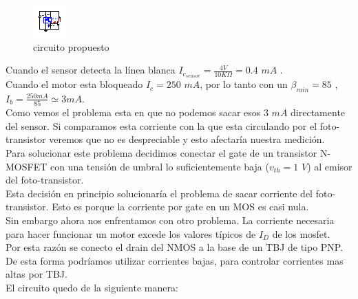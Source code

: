 \documentclass[a4paper]{article}
\begin{document}
\begin{figure}[H]
  \centering
    \includegraphics[width=\textwidth]{./xcircuit/definiendo2.eps}
  \caption{circuito propuesto}
\end{figure}

Cuando el sensor detecta la línea blanca $I_{c_{sensor}}=\frac{4 V}{10 K \Omega}= 0.4$ $mA$ .\\
Cuando el motor esta bloqueado $I_c=250$ $mA$, por lo tanto con un $\beta_{min}=85$ , $I_{b}=\frac{250 mA}{85}\simeq 3 mA$. \\
Como vemos el problema esta en que no podemos sacar esos 3 $mA$ directamente del sensor. Si comparamos esta corriente 
con la que esta circulando por el foto-transistor veremos que no es despreciable y esto afectaría nuestra medición.\\

Para solucionar este problema decidimos conectar el gate de un transistor N-MOSFET con una tensión de umbral
lo suficientemente baja ($v_{th}= 1$ $V$) al emisor del foto-transistor.\\
Esta decisión en principio solucionaría el problema de sacar corriente del foto-transistor. Esto es porque la corriente por gate en un MOS es casi nula.\\

Sin embargo ahora nos enfrentamos con otro problema. La corriente necesaria para hacer funcionar un motor excede los valores típicos de $I_D$ de los mosfet.\\
Por esta razón se conecto el drain del NMOS a la base de un TBJ de tipo PNP. De esta forma podríamos utilizar corrientes bajas,
para controlar corrientes mas altas por TBJ. \\
El circuito quedo de la siguiente manera:
\end{document}
